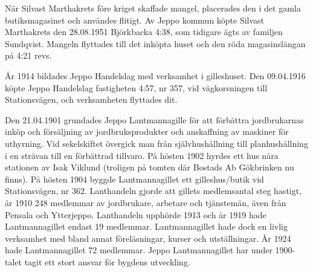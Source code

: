 När Silvast Marthakrets före kriget skaffade mangel, placerades den i det gamla butiksmagasinet och användes flitigt. Av Jeppo kommun köpte Silvast Marthakrets den 28.08.1951 Björkbacka 4:38, som tidigare ägts av familjen Sundqvist. Mangeln flyttades till det inköpta huset och den röda magasinslängan på 4:21 revs.


År 1914 bildades Jeppo Handelslag med verksamhet i gilleshuset. Den 09.04.1916 köpte Jeppo Handelslag fastigheten 4:57, nr 357, vid vägkorsningen till Stationsvägen, och verksamheten flyttades dit.


Den 21.04.1901 grundades Jeppo Lantmannagille för att förbättra jordbrukarnas inköp och försäljning av jordbruksprodukter och anskaffning av maskiner för uthyrning. Vid sekelskiftet övergick man från självhushållning till planhushållning i en strävan till en förbättrad tillvaro. På hösten 1902 hyrdes ett hus nära stationen av Isak Viklund	(troligen på tomten där Bostads Ab Gökbrinken nu finns). På hösten 1904 byggde Lantmannagillet ett gilleshus/butik vid Stationsvägen, 	nr 362. Lanthandeln gjorde att gillets medlemsantal steg hastigt, år 1910	248 medlemmar av jordbrukare, arbetare och tjänstemän, även från 	Pensala och Ytterjeppo. Lanthandeln upphörde 1913 och år 1919 hade 	Lantmannagillet endast 19 medlemmar. Lantmannagillet hade dock en livlig verksamhet med bland annat föreläsningar, kurser och 	utställningar. År 1924 hade Lantmannagillet 72 medlemmar. Jeppo	Lantmannagillet har under 1900-talet tagit ett stort ansvar för bygdens utveckling.






